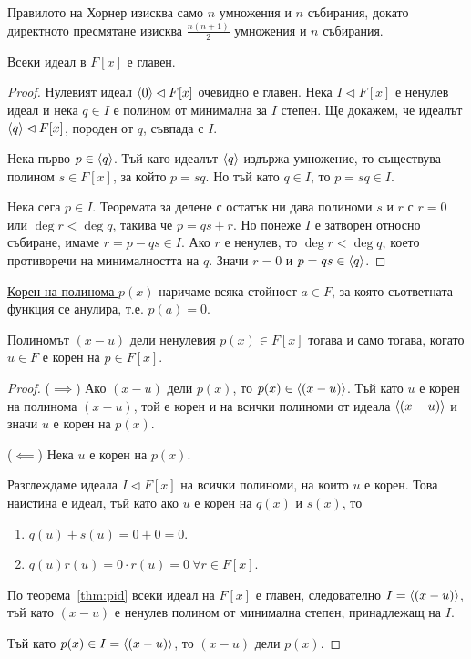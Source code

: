 \documentclass[numbers=endperiod, DIV=15]{scrartcl}
\begin{document}
Правилото на Хорнер изисква само $n$ умножения и $n$ събирания, докато директното пресмятане изисква $\frac {n(n+1)} 2$ умножения и $n$ събирания.

\begin{theorem}\label{thm:pid}
  Всеки идеал в $F[x]$ е главен.
\end{theorem}
\begin{proof}
  Нулевият идеал $\left\langle 0 \right\rangle \lhd F[x]$ очевидно е главен. Нека $I \lhd F[x]$ е ненулев идеал и нека $q \in I$ е полином от минимална за $I$ степен. Ще докажем, че идеалът $\left\langle q \right\rangle \lhd F[x]$, породен от $q$, съвпада с $I$.

  Нека първо $p \in \left\langle q \right\rangle$. Тъй като идеалът $\left\langle q \right\rangle$ издържа умножение, то съществува полином $s \in F[x]$, за който $p = sq$. Но тъй като $q \in I$, то $p = sq \in I$.

  Нека сега $p \in I$. Теоремата за делене с остатък ни дава полиноми $s$ и $r$ с $r = 0$ или $\deg r < \deg q$, такива че $p = qs + r$. Но понеже $I$ е затворен относно събиране, имаме $r = p - qs \in I$. Ако $r$ е ненулев, то $\deg r < \deg q$, което противоречи на минималността на $q$. Значи $r = 0$ и $p = qs \in \left\langle q \right\rangle$.
\end{proof}

\begin{definition}
  \underline{Корен на полинома $p(x)$} наричаме всяка стойност $a \in F$, за която съответната функция се анулира, т.е. $p(a) = 0$.
\end{definition}

\begin{proposition}\label{thm:div-iff-root}
  Полиномът $(x - u)$ дели ненулевия $p(x) \in F[x]$ тогава и само тогава, когато $u \in F$ е корен на $p \in F[x]$.
\end{proposition}
\begin{proof}
  ($\implies$) Ако $(x - u)$ дели $p(x)$, то $p(x) \in \left\langle (x - u) \right\rangle$. Тъй като $u$ е корен на полинома $(x - u)$, той е корен и на всички полиноми от идеала $\left\langle (x - u) \right\rangle$ и значи $u$ е корен на $p(x)$.

  ($\impliedby$) Нека $u$ е корен на $p(x)$.

  Разглеждаме идеала $I \lhd F[x]$ на всички полиноми, на които $u$ е корен. Това наистина е идеал, тъй като ако $u$ е корен на $q(x)$ и $s(x)$, то
  \begin{enumerate}
    \item $q(u) + s(u) = 0 + 0 = 0$.
    \item $q(u) r(u) = 0 \cdot r(u) = 0~\forall r \in F[x]$.
  \end{enumerate}

  По теорема~\ref{thm:pid} всеки идеал на $F[x]$ е главен, следователно $I = \left\langle (x - u) \right\rangle$, тъй като $(x - u)$ е ненулев полином от минимална степен, принадлежащ на $I$.

  Тъй като $p(x) \in I = \left\langle (x - u) \right\rangle$, то $(x - u)$ дели $p(x)$.
\end{proof}
\end{document}
